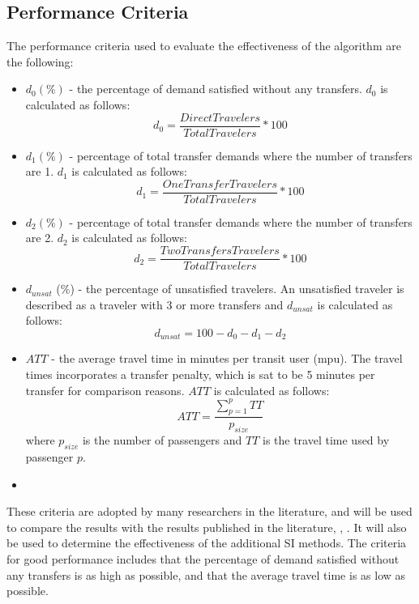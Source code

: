 \subsection{Performance Criteria}
\label{sec:performanceCriteria}
The performance criteria used to evaluate the effectiveness of the algorithm are the following:
\begin{itemize}
\item $d_0 (\%)$ - the percentage of demand satisfied without any transfers. $d_0$ is calculated as follows:
$$ d_0 = \frac{DirectTravelers}{TotalTravelers}*100$$
\item $d_1 (\%)$ - percentage of total transfer demands where the number of transfers are 1. $d_1$ is calculated as follows:
$$ d_1 = \frac{OneTransferTravelers}{TotalTravelers}*100$$
\item $d_2 (\%)$ - percentage of total transfer demands where the number of transfers are 2. $d_2$ is calculated as follows:
$$ d_2 = \frac{TwoTransfersTravelers}{TotalTravelers}*100$$
\item $d_{unsat}$ (\%) - the percentage of unsatisfied travelers. An unsatisfied traveler is described as a traveler with 3 or more transfers and $d_{unsat}$ is calculated as follows:
$$ d_{unsat} = 100 - d_0 - d_1 - d_2$$
\item $ATT$  - the average travel time in minutes per transit user (mpu). The travel times incorporates a transfer penalty, which is sat to be 5 minutes per transfer for comparison reasons. $ATT$ is calculated as follows:
$$ATT = \frac{\sum\limits^{p}_{p=1}TT}{p_{size}}$$
where $p_{size}$ is the number of passengers and $TT$ is the travel time used by passenger $p$. 
\item[ ] 
\end{itemize}%
These criteria are adopted by many researchers in the literature, and will be used to compare the results with the results published in the literature\citep{kechagiopoulos14}, \citep{mandl79}, \citep{fan09}. It will also be used to determine the effectiveness of the additional SI methods. The criteria for good performance includes that the percentage of demand satisfied without any transfers is as high as possible, and that the average travel time is as low as possible.


